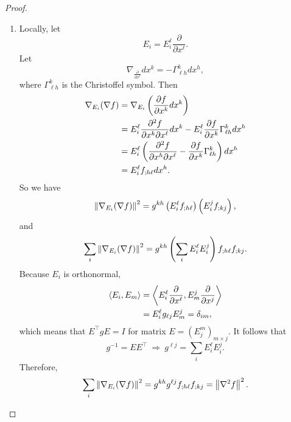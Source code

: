 \begin{proof}
    \begin{enumerate}[label=(\arabic{*})]
        \item Locally, let
        \begin{equation*}
            E_i = E_i^\ell \frac{\partial}{\partial x^\ell}.
        \end{equation*}
        Let
        \begin{equation*}
            \nabla_{\frac{\partial}{\partial x^\ell}}dx^k = -\Gamma^k_{\ell h}dx^h,
        \end{equation*}
        where $\Gamma^k_{\ell h}$ is the Christoffel symbol. Then
        \begin{align*}
            \nabla_{E_i} (\nabla f) &= \nabla_{E_i} \left(\frac{\partial f}{\partial x^k} dx^k\right) \\
            &= E_i^\ell \frac{\partial^2 f}{\partial x^k \partial x^\ell}dx^k - E^\ell_i\frac{\partial f}{\partial x^k}\Gamma^k_{\ell h}dx^h \\
            &= E_i^\ell \left(\frac{\partial^2 f}{\partial x^h \partial x^\ell} - \frac{\partial f}{\partial x^k}\Gamma^k_{\ell h}\right)dx^h \\
            &= E_i^\ell f_{;h\ell} dx^h.
        \end{align*}
        So we have
        \begin{equation*}
            \left\lVert\nabla_{E_i} (\nabla f)\right\lVert^2 = g^{kh}\left(E_i^\ell f_{;h \ell}\right)\left(E_i^j f_{;k j}\right),
        \end{equation*}
        and
        \begin{equation*}
            \sum_i\left\lVert\nabla_{E_i} (\nabla f)\right\lVert^2 = g^{kh} \left( \sum_i E_i^\ell E_i^j\right) f_{;h \ell}f_{;k j}.
        \end{equation*}
        Because $E_i$ is orthonormal,
        \begin{align*}
            \left\langle E_i,E_m \right\rangle &= \left\langle E_i^\ell \frac{\partial}{\partial x^\ell},E_m^j \frac{\partial}{\partial x^j} \right\rangle \\
            &= E_i^\ell g_{\ell j} E_m^j = \delta_{im},
        \end{align*}
        which means that $E^\top gE = I$ for matrix $E = (E^m_j)_{m \times j}$. It follows that
        \begin{equation*}
            g^{-1} = EE^\top ~\Rightarrow~ g^{\ell j} = \sum_i E^\ell_iE^j_i.
        \end{equation*}
        Therefore,
        \begin{equation*}
             \sum_i\left\lVert\nabla_{E_i} (\nabla f)\right\lVert^2 = g^{kh} g^{\ell j} f_{;h \ell}f_{;k j} = \left\lVert\nabla^2 f\right\lVert^2.
        \end{equation*}


\end{enumerate}
\end{proof}
